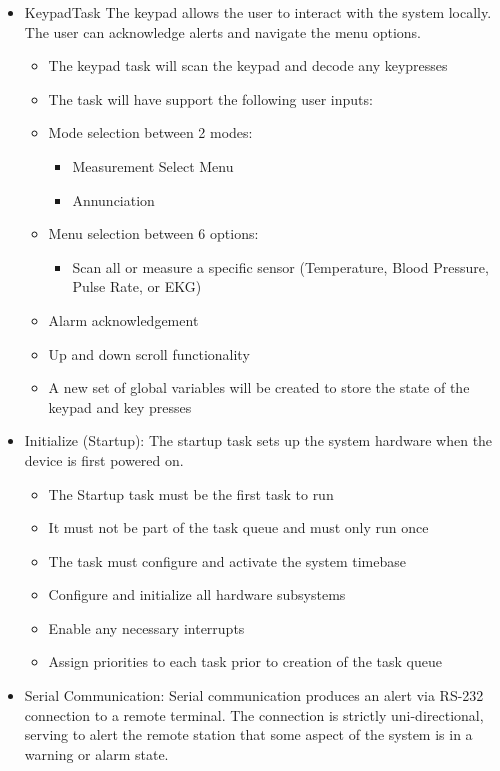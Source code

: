 \documentclass[12pt]{article} %
\begin{document}
\begin{itemize}
  \item KeypadTask
		The keypad allows the user to interact with the system locally. The user
		can acknowledge alerts and navigate the menu options.
    \begin{itemize}
      \item The keypad task will scan the keypad and decode any keypresses
      \item The task will have support the following user inputs:
      \item Mode selection between 2 modes:
				\begin{itemize}
					\item Measurement Select Menu
					\item Annunciation
				\end{itemize}
      \item Menu selection between 6 options:
				\begin{itemize}
					\item Scan all or measure a specific sensor (Temperature, Blood
						Pressure, Pulse Rate, or EKG)
				\end{itemize}
      \item Alarm acknowledgement
      \item Up and down scroll functionality 
      \item A new set of global variables will be created to store the state of the keypad and key presses
    \end{itemize}

  \item Initialize (Startup):
		The startup task sets up the system hardware when the device is first powered on.
    \begin{itemize}
			\item The Startup task must be the first task to run
			\item It must not be part of the task queue and must only run once
			\item The task must configure and activate the system timebase
			\item Configure and initialize all hardware subsystems
			\item Enable any necessary interrupts
			\item Assign priorities to each task prior to creation of the task queue
    \end{itemize}

  \item Serial Communication:
		Serial communication produces an alert via RS-232 connection to a remote
		terminal. The connection is strictly uni-directional, serving to alert the
		remote station that some aspect of the system is in a warning or alarm
		state.


\end{itemize}
\end{document}
